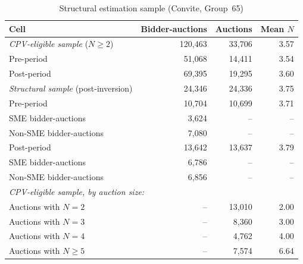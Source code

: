 \documentclass[12pt]{article}
\begin{document}
\begin{table}[htbp]
\centering
\caption{Structural estimation sample (Convite, Group~65)}
\label{tab:sample}
\begin{threeparttable}
\small
\setlength{\tabcolsep}{4pt}
\begin{tabular}{lrrr}
\toprule
Cell & Bidder-auctions & Auctions & Mean $N$ \\
\midrule
\textit{CPV-eligible sample} ($N \geq 2$)    & 120{,}463 & 33{,}706 & 3.57 \\
\hspace{1em} Pre-period                      & 51{,}068  & 14{,}411 & 3.54 \\
\hspace{1em} Post-period                     & 69{,}395  & 19{,}295 & 3.60 \\
\midrule
\textit{Structural sample} (post-inversion)  & 24{,}346  & 24{,}336 & 3.75 \\
\hspace{1em} Pre-period                      & 10{,}704  & 10{,}699 & 3.71 \\
\hspace{2em} SME bidder-auctions             & 3{,}624   & --       & -- \\
\hspace{2em} Non-SME bidder-auctions         & 7{,}080   & --       & -- \\
\hspace{1em} Post-period                     & 13{,}642  & 13{,}637 & 3.79 \\
\hspace{2em} SME bidder-auctions             & 6{,}786   & --       & -- \\
\hspace{2em} Non-SME bidder-auctions         & 6{,}856   & --       & -- \\
\midrule
\multicolumn{4}{l}{\textit{CPV-eligible sample, by auction size:}} \\
\hspace{1em} Auctions with $N = 2$           & -- & 13{,}010 & 2.00 \\
\hspace{1em} Auctions with $N = 3$           & -- & 8{,}360  & 3.00 \\
\hspace{1em} Auctions with $N = 4$           & -- & 4{,}762  & 4.00 \\
\hspace{1em} Auctions with $N \geq 5$        & -- & 7{,}574  & 6.64 \\

\end{tabular}
\end{threeparttable}
\end{table}
\end{document}
